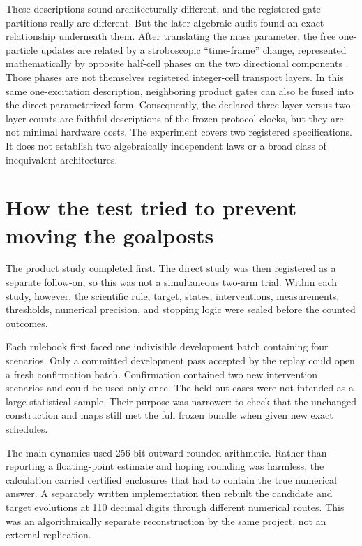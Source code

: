\documentclass[11pt]{article}
\begin{document}
These descriptions sound architecturally different, and the registered gate
partitions really are different.  But the later algebraic audit found an exact
relationship underneath them.  After translating the mass parameter, the free
one-particle updates are related by a stroboscopic ``time-frame'' change,
represented mathematically by opposite half-cell phases on the two directional
components \citep{AsbothObuse2013TimeFrames}.  Those phases are not themselves
registered integer-cell transport layers.  In this same one-excitation
description, neighboring product gates can also be fused into the direct
parameterized form.  Consequently, the declared
three-layer versus two-layer counts are faithful descriptions of the frozen
protocol clocks, but they are not minimal hardware costs.  The experiment
covers two registered specifications.  It does not establish two algebraically
independent laws or a broad class of inequivalent architectures.

\section{How the test tried to prevent moving the goalposts}

The product study completed first.  The direct study was then registered as a
separate follow-on, so this was not a simultaneous two-arm trial.  Within each
study, however, the scientific rule, target, states, interventions,
measurements, thresholds, numerical precision, and stopping logic were sealed
before the counted outcomes.

Each rulebook first faced one indivisible development batch containing four
scenarios.  Only a committed development pass accepted by the replay could
open a fresh confirmation batch.  Confirmation contained two new intervention
scenarios and could be used only once.  The held-out cases were not intended as
a large statistical sample.  Their purpose was narrower: to check that the
unchanged construction and maps still met the full frozen bundle when given
new exact schedules.

The main dynamics used 256-bit outward-rounded arithmetic.  Rather than
reporting a floating-point estimate and hoping rounding was harmless, the
calculation carried certified enclosures that had to contain the true numerical
answer.  A separately written implementation then rebuilt the candidate and
target evolutions at 110 decimal digits through different numerical routes.
This was an algorithmically separate reconstruction by the same project, not
an external replication.
\end{document}
